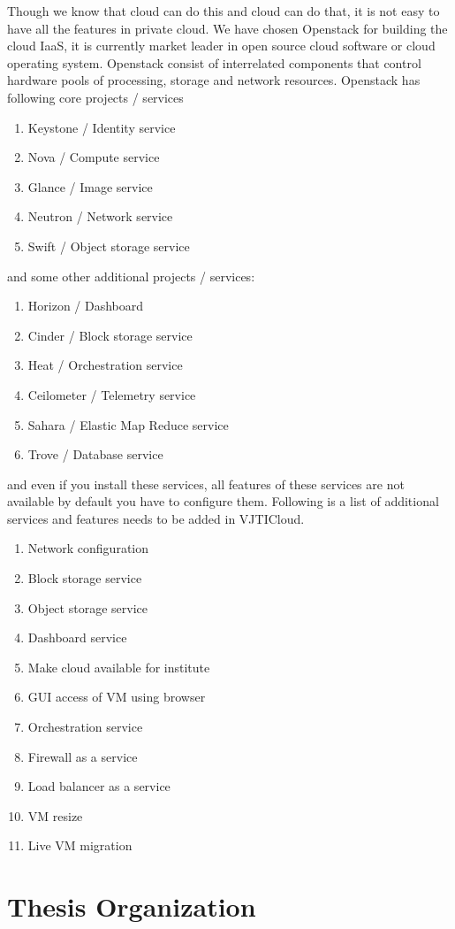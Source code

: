 Though we know that cloud can do this and cloud can do that, it is not easy to have all the features in private cloud. We have chosen Openstack for building the cloud IaaS, it is currently market leader in open source cloud software or cloud operating system. Openstack consist of interrelated components that control hardware pools of processing, storage and network resources\cite{wiki}. Openstack has following core projects / services
\begin{enumerate}
    \item Keystone / Identity service
    \item Nova / Compute service
    \item Glance / Image service
    \item Neutron / Network service
    \item Swift / Object storage service
\end{enumerate}

and some other additional projects / services:
\begin{enumerate}
    \item Horizon / Dashboard
    \item Cinder / Block storage service
    \item Heat / Orchestration service
    \item Ceilometer / Telemetry service
    \item Sahara / Elastic Map Reduce service
    \item Trove / Database service
\end{enumerate}

and even if you install these services, all features of these services are not available by default you have to configure them. Following is a list of additional services and features needs to be added in VJTICloud.

\begin{enumerate}
  \item Network configuration
  \item Block storage service
  \item Object storage service
  \item Dashboard service
  \item Make cloud available for institute
  \item GUI access of VM using browser
  \item Orchestration service
  \item Firewall as a service
  \item Load balancer as a service
  \item VM resize 
  \item Live VM migration
  
\end{enumerate}

\section{Thesis Organization}

\makeatother